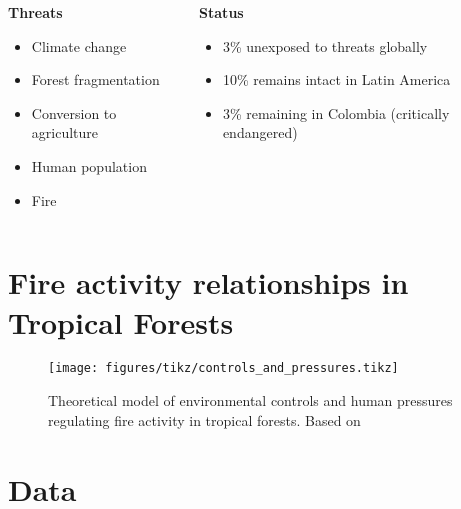 \documentclass[10pt]{beamer}
\begin{document}
{%
\begin{frame}{}
    \begin{columns}[onlytextwidth]
        \begin{column}{0.45\textwidth}
            \textbf{Threats}
            \begin{itemize}
                \item Climate change
                \item Forest fragmentation
                \item Conversion to agriculture
                \item Human population
                \item \alert{Fire}
            \end{itemize}
        \end{column}
        \begin{column}{0.55\textwidth}
            \textbf{Status}
            \begin{itemize}
                \item 3\% unexposed to threats globally
                \item 10\% remains intact in Latin America
                \item \alert{3\% remaining in Colombia (critically endangered)}
            \end{itemize}
        \end{column}
    \end{columns}
\end{frame}
}

\section{Fire activity relationships in Tropical Forests}

\begin{frame}{}
    \begin{figure}
        \centering
        \texttt{[image: figures/tikz/controls\_and\_pressures.tikz]}
        \caption{Theoretical model of environmental controls and human pressures regulating fire activity in tropical forests. Based on \citet{Cochrane2003,Shlisky2009,Bowman2011}}
    \end{figure}
\end{frame}

\section{Data}
\end{document}
